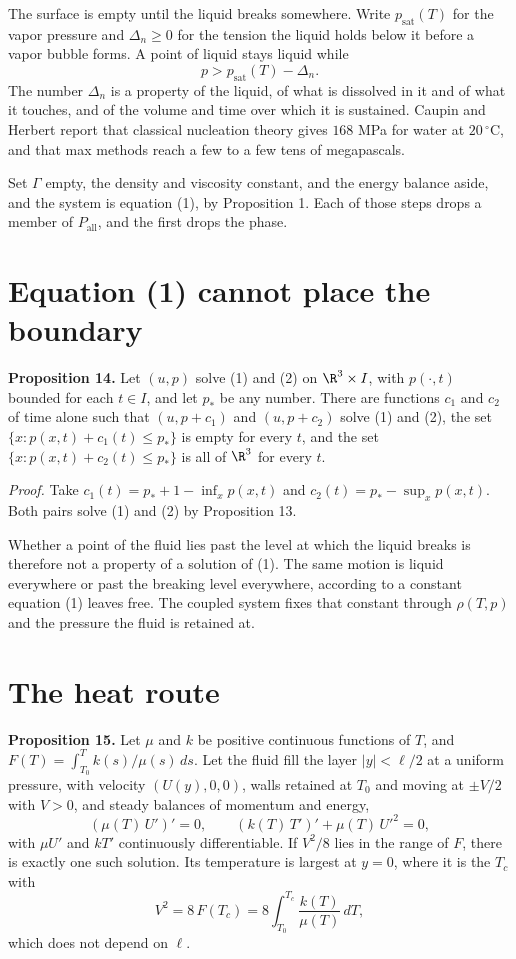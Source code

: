 The surface is empty until the liquid breaks somewhere. Write $p_{\mathrm{sat}}(T)$ for the vapor
pressure and $\Delta_n \ge 0$ for the tension the liquid holds below it before a vapor bubble
forms. A point of liquid stays liquid while
\[
p > p_{\mathrm{sat}}(T) - \Delta_n .
\]
The number $\Delta_n$ is a property of the liquid, of what is dissolved in it and of what it
touches, and of the volume and time over which it is sustained. Caupin and Herbert report that
classical nucleation theory gives $168$ MPa for water at $20\,^\circ$C, and that max methods
reach a few to a few tens of megapascals.

Set $\Gamma$ empty, the density and viscosity constant, and the energy balance aside, and the
system is equation (1), by Proposition 1. Each of those steps drops a member of
$P_{\mathrm{all}}$, and the first drops the phase.

\section{Equation (1) cannot place the boundary}

\textbf{Proposition 14.} Let $(u,p)$ solve (1) and (2) on $\R^3\times I$, with $p(\cdot,t)$
bounded for each $t\in I$, and let $p_*$ be any number. There are functions $c_1$ and $c_2$ of time
alone such that $(u,p+c_1)$ and $(u,p+c_2)$ solve (1) and (2), the set
$\{x : p(x,t) + c_1(t) \le p_*\}$ is empty for every $t$, and the set
$\{x : p(x,t) + c_2(t) \le p_*\}$ is all of $\R^3$ for every $t$.

\emph{Proof.} Take $c_1(t) = p_* + 1 - \inf_x p(x,t)$ and $c_2(t) = p_* - \sup_x p(x,t)$. Both
pairs solve (1) and (2) by Proposition 13. \hfill\qedsymbol

Whether a point of the fluid lies past the level at which the liquid breaks is therefore not a
property of a solution of (1). The same motion is liquid everywhere or past the breaking level
everywhere, according to a constant equation (1) leaves free. The coupled system fixes that
constant through $\rho(T,p)$ and the pressure the fluid is retained at.

\section{The heat route}

\textbf{Proposition 15.} Let $\mu$ and $k$ be positive continuous functions of $T$, and
$F(T) = \int_{T_0}^{T} k(s)/\mu(s)\,ds$. Let the fluid fill the layer $|y| < \ell/2$ at a uniform
pressure, with velocity $(U(y),0,0)$, walls retained at $T_0$ and moving at $\pm V/2$ with $V > 0$,
and steady balances of momentum and energy,
\[
(\mu(T)\,U')' = 0, \qquad (k(T)\,T')' + \mu(T)\,U'^2 = 0,
\]
with $\mu U'$ and $kT'$ continuously differentiable. If $V^2/8$ lies in the range of $F$, there
is exactly one such solution. Its temperature is largest at $y = 0$, where it is the $T_c$ with
\[
V^2 = 8\,F(T_c) = 8\int_{T_0}^{T_c}\frac{k(T)}{\mu(T)}\,dT ,
\]
which does not depend on $\ell$.

